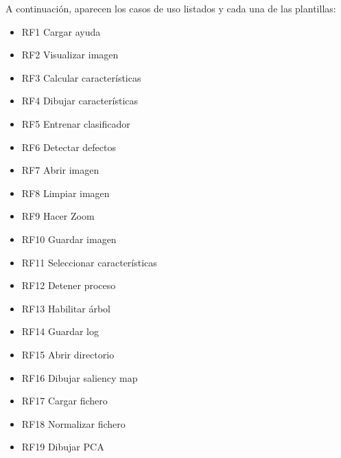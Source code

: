 \newpage
A continuación, aparecen los casos de uso listados y cada una de las plantillas:
\begin{itemize}
 \item RF1 Cargar ayuda 
 \item RF2 Visualizar imagen 
 \item RF3 Calcular características 
 \item RF4 Dibujar características 
 \item RF5 Entrenar clasificador 
 \item RF6 Detectar defectos 
 \item RF7  Abrir imagen 
 \item RF8  Limpiar imagen 
 \item RF9  Hacer Zoom 
 \item RF10 Guardar imagen 
 \item RF11 Seleccionar características 
 \item RF12 Detener proceso 
 \item RF13 Habilitar árbol 
 \item RF14 Guardar log 
 \item RF15 Abrir directorio 
 \item RF16 Dibujar saliency map 
 \item RF17 Cargar fichero \arff{} 
 \item RF18 Normalizar fichero \arff{} 
 \item RF19 Dibujar PCA 
\end{itemize}

